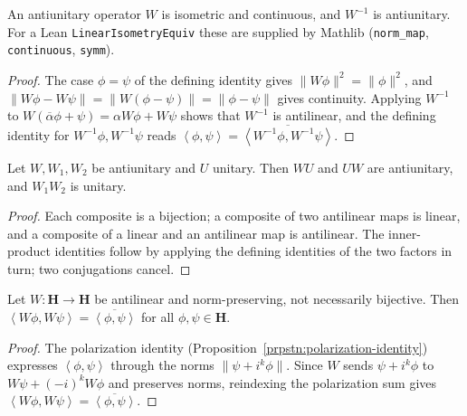 \begin{lemma}
    \label{lmm:antiunitary-isometric}
    \leanok
    An antiunitary operator $W$ is isometric and continuous, and $W^{-1}$ is antiunitary. For a Lean \texttt{LinearIsometryEquiv} these are supplied by Mathlib (\texttt{norm\_map}, \texttt{continuous}, \texttt{symm}).
\end{lemma}
\begin{proof}
    \leanok
    The case $\phi = \psi$ of the defining identity gives $\|W\phi\|^2 = \|\phi\|^2$, and $\|W\phi - W\psi\| = \|W(\phi - \psi)\| = \|\phi - \psi\|$ gives continuity. Applying $W^{-1}$ to $W(\overline{\alpha}\phi + \psi) = \alpha W\phi + W\psi$ shows that $W^{-1}$ is antilinear, and the defining identity for $W^{-1}\phi, W^{-1}\psi$ reads $\left< \phi, \psi \right> = \overline{\left< W^{-1}\phi, W^{-1}\psi \right>}$.
\end{proof}

\begin{lemma}
    \label{lmm:antiunitary-composition}
    \leanok
    Let $W, W_1, W_2$ be antiunitary and $U$ unitary. Then $WU$ and $UW$ are antiunitary, and $W_1W_2$ is unitary.
\end{lemma}
\begin{proof}
    \leanok
    Each composite is a bijection; a composite of two antilinear maps is linear, and a composite of a linear and an antilinear map is antilinear. The inner-product identities follow by applying the defining identities of the two factors in turn; two conjugations cancel.
\end{proof}

\begin{lemma}
    \label{lmm:conjugate-linear-isometry-inner}
    \leanok
    Let $W : \mathbf{H} \to \mathbf{H}$ be antilinear and norm-preserving, not necessarily bijective. Then $\left< W\phi, W\psi \right> = \overline{\left< \phi, \psi \right>}$ for all $\phi, \psi \in \mathbf{H}$.
\end{lemma}
\begin{proof}
    \leanok
    The polarization identity (Proposition~\ref{prpstn:polarization-identity}) expresses $\left< \phi, \psi \right>$ through the norms $\|\psi + i^k\phi\|$. Since $W$ sends $\psi + i^k\phi$ to $W\psi + (-i)^kW\phi$ and preserves norms, reindexing the polarization sum gives $\left< W\phi, W\psi \right> = \overline{\left< \phi, \psi \right>}$.
\end{proof}

